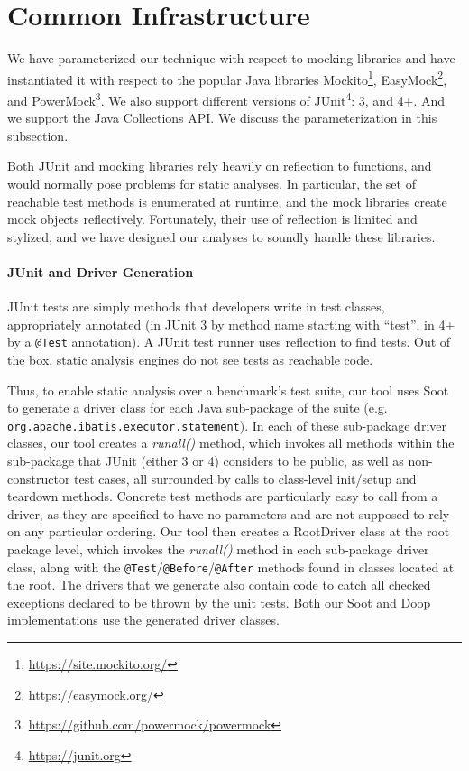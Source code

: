 \section{Common Infrastructure}
\label{sec:common}
We have parameterized our technique with respect to mocking libraries and have instantiated it with respect to the popular Java libraries Mockito\footnote{\url{https://site.mockito.org/}}, EasyMock\footnote{\url{https://easymock.org/}}, and PowerMock\footnote{\url{https://github.com/powermock/powermock}}. We also support different versions of JUnit\footnote{\url{https://junit.org}}: 3, and 4+. And we support the Java Collections API. We discuss the parameterization in this subsection.

Both JUnit and mocking libraries rely heavily on reflection to functions, and would normally pose problems for static analyses. In particular, the set of reachable test methods is enumerated at runtime, and the mock libraries create mock objects reflectively. Fortunately, their use of reflection is limited and stylized, and we have designed our analyses to soundly handle these libraries.

\paragraph{JUnit and Driver Generation}
JUnit tests are simply methods that developers write in test classes, appropriately annotated (in JUnit 3 by method name starting with ``test'', in 4+ by a \texttt{@Test} annotation). A JUnit test runner uses reflection to find tests. Out of the box, static analysis engines do not see tests as reachable code.


Thus, to enable static analysis over a benchmark's test suite, our tool uses Soot to generate a driver class for each Java sub-package of the suite (e.g. \texttt{org.apache.ibatis.executor.statement}). In each of these sub-package driver classes, our tool creates a \textit{runall()} method, which invokes all methods within the sub-package that JUnit (either 3 or 4) considers to be public, as well as non-constructor test cases, all surrounded by calls to class-level init/setup and teardown methods. Concrete test methods are particularly easy to call from a driver, as they are specified to have no parameters and are not supposed to rely on any particular ordering. 
Our tool then creates a RootDriver class at the root package level, which invokes the \textit{runall()} method in each sub-package driver class, along with the \texttt{@Test}/\texttt{@Before}/\texttt{@After} methods found in classes located at the root. The drivers that we generate also contain code to catch all checked exceptions declared to be thrown by the unit tests. Both our Soot and Doop implementations use the generated driver classes.

